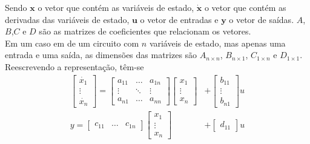 \documentclass{article}
\numberwithin{equation}{section}
\begin{document}
    Sendo $\textbf{x}$ o vetor que contém as variáveis de estado, $\dot{\textbf{x}}$ o vetor que contém as derivadas das variáveis de estado, $\textbf{u}$ o vetor de entradas e $\textbf{y}$ o vetor de saídas. $A$,$B$,$C$ e $D$ são as matrizes de coeficientes que relacionam os vetores. \\
    Em um caso em de um circuito com $n$ variáveis de estado, mas apenas uma entrada e uma saída, as dimensões das matrizes são
    $A_{n\times n}$, $B_{n\times 1}$, $C_{1\times n}$ e $D_{1\times 1}$. Reescrevendo a representação, têm-se
    \begin{eqnarray}
        \begin{bmatrix}
            \dot{x_{1}}  \\
            \vdots \\
            \dot{x_{n}}
        \end{bmatrix}
        = %
        \begin{bmatrix}
            a_{11} & \dots & a_{1n}\\
            \vdots & \ddots& \vdots\\
            a_{n1} & \dots & a_{nn}
        \end{bmatrix}
        \begin{bmatrix}
            x_{1} \\
            \vdots\\
            x_{n}
        \end{bmatrix} &+ %
        \begin{bmatrix}
            b_{11}\\
            \vdots\\
            b_{n1}
        \end{bmatrix}
        u
    \\
        y =
        \begin{bmatrix}
            c_{11} & \dots & c_{1n}
        \end{bmatrix}
        \begin{bmatrix}
            x_{1} \\
            \vdots\\
            x_{n}
        \end{bmatrix} &+ %
        \begin{bmatrix}
            d_{11}
        \end{bmatrix}
        u
    \end{eqnarray}
\end{document}

